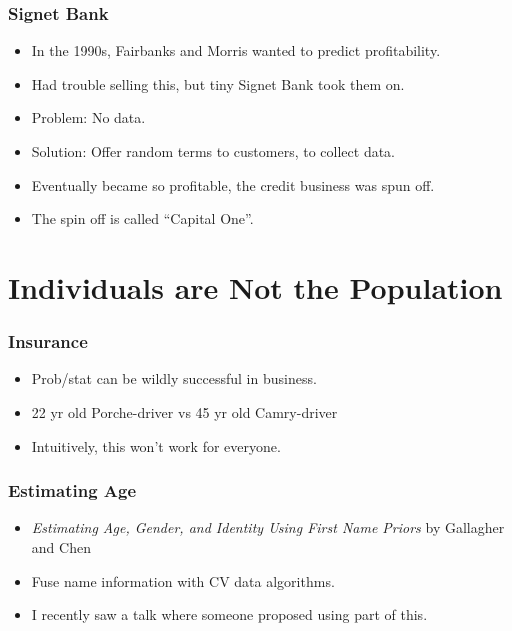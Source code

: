 \documentclass{beamer}
\begin{document}

\begin{frame}
\frametitle{Signet Bank}
\begin{itemize}
    \item<1->In the 1990s, Fairbanks and Morris wanted to predict
        profitability.
    \item<2->Had trouble selling this, but tiny Signet Bank took them on.
    \item<3->Problem:  No data.
    \item<4->Solution: Offer random terms to customers, to collect data.
    \item<5->Eventually became so profitable, the credit business was spun off.
    \item<6->The spin off is called ``Capital One''. 
\end{itemize}
\end{frame}


\section{Individuals are Not the Population}
\begin{frame}
	\frametitle{Insurance}
	\begin{itemize}
        \item<1->Prob/stat can be wildly successful in business.
        \item<2->22 yr old Porche-driver vs 45 yr old Camry-driver
        \item<3->Intuitively, this won't work for everyone.
    \end{itemize}
\end{frame}


\begin{frame}
	\frametitle{Estimating Age}
	\begin{itemize}
        \item \textit{Estimating Age, Gender, and Identity Using First Name
                Priors} by Gallagher and Chen
        \item Fuse name information with CV data algorithms.
        \item<2->I recently saw a talk where someone proposed using part of this.
    \end{itemize}
\end{frame}
\end{document}
